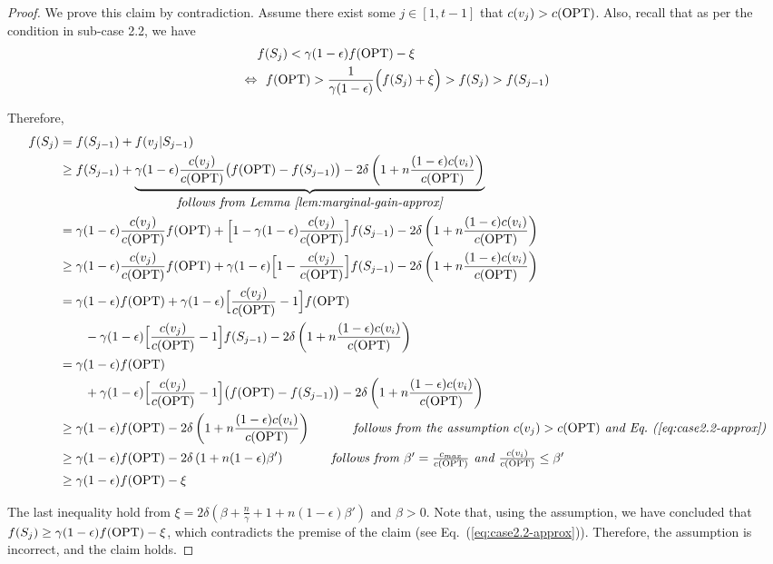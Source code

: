 \documentclass[10pt]{article} %
\theoremstyle{remark}
\newcommand{\OPT}{{\rm OPT}}
\begin{document}
\begin{proof}
We prove this claim by contradiction. Assume there exist some $j \in [1, t-1]$ that $c(v_j)>c(\OPT)$. Also, recall that as per the condition in sub-case 2.2, we have
\begin{align}
    &f(S_j) < \gamma(1-\epsilon)f(\OPT) - \xi \nonumber\\ 
\Leftrightarrow &~~ f(\OPT) > \displaystyle\frac{1}{\gamma(1-\epsilon)} \Big(f(S_j)+\xi\Big) > f(S_j) >f(S_{j-1})
\label{eq:case2.2-approx}
\end{align}


Therefore, 
\begin{align*}
    f(S_j)&= f(S_{j-1}) + f(v_j|S_{j-1})\\
    &\geq f(S_{j-1}) + \underbrace{\gamma(1-\epsilon) \frac{c(v_j)}{c(\OPT)} \big ( f(\OPT) - f(S_{j-1}) \big ) - 2\delta  \left( 1+n\frac{(1-\epsilon)c(v_i)}{ c(\OPT)} \right)}_{\mbox{\it  follows from Lemma~\ref{lem:marginal-gain-approx}}} \\
    &= \gamma(1-\epsilon)\frac{c(v_j)}{c(\OPT)} f(\OPT) + \Big[ 1- \gamma(1-\epsilon)\frac{c(v_j)}{c(\OPT)} \Big]f(S_{j-1}) - 2\delta  \left( 1+n\frac{(1-\epsilon)c(v_i)}{ c(\OPT)} \right)\\
    &\geq { \gamma(1-\epsilon)\frac{c(v_j)}{c(\OPT)} f(\OPT)} + \gamma(1-\epsilon)\Big[ 1- \frac{c(v_j)}{c(\OPT)} \Big]f(S_{j-1})- 2\delta  \left( 1+n\frac{(1-\epsilon)c(v_i)}{ c(\OPT)} \right)\\
    &= {\gamma(1-\epsilon) f(\OPT) + \gamma(1-\epsilon)\Big[ \frac{c(v_j)}{c(\OPT)} - 1 \Big]f(\OPT)} \\ &\quad \quad - \gamma(1-\epsilon)\Big[ \frac{c(v_j)}{c(\OPT)} - 1 \Big] f(S_{j-1})- 2\delta  \left( 1+n\frac{(1-\epsilon)c(v_i)}{ c(\OPT)} \right)\\
    &= \gamma(1-\epsilon) f(\OPT) \\ &\quad\quad + \gamma(1-\epsilon)\Big[ \frac{c(v_j)}{c(\OPT)} - 1 \Big] \big( f(\OPT) - f(S_{j-1}) \big)- 2\delta  \left( 1+n\frac{(1-\epsilon)c(v_i)}{ c(\OPT)} \right)\\
    &\geq \gamma(1-\epsilon) f(\OPT) - 2\delta  \left( 1+n\frac{(1-\epsilon)c(v_i)}{ c(\OPT)} \right)  \ \ \ \ \ \ \ \ \ \ \mbox{\it follows from the assumption $c(v_j)>c(\OPT)$ and Eq.~(\ref{eq:case2.2-approx})}\\
    &\geq \gamma(1-\epsilon) f(\OPT) - 2\delta  \left( 1+n(1-\epsilon)\beta' \right) \ \ \ \ \ \ \ \ \ \ \ \mbox{\it follows from $\beta' = \frac{c_{max}}{c(\OPT)}$ and $\frac{c(v_i)}{ c(\OPT)} \leq \beta'$}\\
    &\geq \gamma(1-\epsilon) f(\OPT) - \xi
\end{align*}

The last inequality hold from $\xi = 2\delta\left(\beta+ \frac{n}{\gamma} + 1 + n(1-\epsilon)\beta'\right)$ and $\beta>0$.
Note that, using the assumption, we have concluded that $f(S_j) \geq \gamma(1-\epsilon) f(\OPT) -\xi$, which contradicts the premise of the claim (see Eq.~(\ref{eq:case2.2-approx})). Therefore, the assumption is incorrect, and the claim holds.
\end{proof}
            
\end{document}
